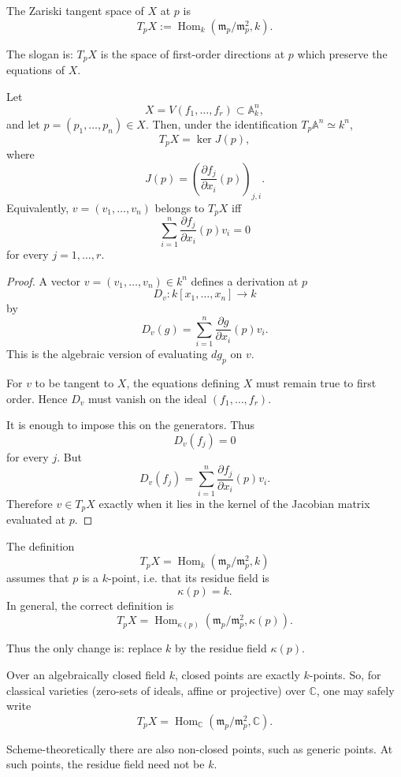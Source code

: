 \begin{definition}
\label{definition-zariski-tangent}
The Zariski tangent space of $X$
at $p$ is
$$
  T_pX
  :=
  \operatorname{Hom}_k
  (\mathfrak m_p/\mathfrak m_p^2,k).
$$
\end{definition}

The slogan is:
$T_pX$ is the space of first-order
directions at $p$ which preserve the
equations of $X$.

\begin{proposition}
\label{proposition-jacobian-tangent}
Let
$$
  X=V(f_1,\ldots,f_r)
  \subset \mathbb A_k^n,
$$
and let $p=(p_1,\ldots,p_n)\in X$.
Then, under the identification
$T_p\mathbb A^n\simeq k^n$,
$$
  T_pX=\ker J(p),
$$
where
$$
  J(p)
  =
  \left(
    \frac{\partial f_j}{\partial x_i}(p)
  \right)_{j,i}.
$$
Equivalently, $v=(v_1,\ldots,v_n)$
belongs to $T_pX$ iff
$$
  \sum_{i=1}^n
  \frac{\partial f_j}{\partial x_i}(p)
  v_i
  =
  0
$$
for every $j=1,\ldots,r$.
\end{proposition}

\begin{proof}
A vector $v=(v_1,\ldots,v_n)\in k^n$
defines a derivation at $p$
$$
  D_v:k[x_1,\ldots,x_n]\to k
$$
by
$$
  D_v(g)
  =
  \sum_{i=1}^n
  \frac{\partial g}{\partial x_i}(p)
  v_i.
$$
This is the algebraic version of
evaluating $dg_p$ on $v$.

For $v$ to be tangent to $X$, the
equations defining $X$ must remain true
to first order. Hence $D_v$ must vanish
on the ideal $(f_1,\ldots,f_r)$.

It is enough to impose this on the
generators. Thus
$$
  D_v(f_j)=0
$$
for every $j$. But
$$
  D_v(f_j)
  =
  \sum_{i=1}^n
  \frac{\partial f_j}{\partial x_i}(p)
  v_i.
$$
Therefore $v\in T_pX$ exactly when
it lies in the kernel of the Jacobian
matrix evaluated at $p$.
\end{proof}

\begin{remark}
\label{remark-residue-field}
The definition
$$
  T_pX
  =
  \operatorname{Hom}_k
  (\mathfrak m_p/\mathfrak m_p^2,k)
$$
assumes that $p$ is a $k$-point, i.e.
that its residue field is
$$
  \kappa(p)=k.
$$
In general, the correct definition is
$$
  T_pX
  =
  \operatorname{Hom}_{\kappa(p)}
  (\mathfrak m_p/\mathfrak m_p^2,\kappa(p)).
$$

Thus the only change is:
replace $k$ by the residue field
$\kappa(p)$.

Over an algebraically closed field $k$,
closed points are exactly $k$-points.
So, for classical varieties 
(zero-sets of ideals, affine or projective)
over $\mathbb C$, one may safely write
$$
  T_pX
  =
  \operatorname{Hom}_{\mathbb C}
  (\mathfrak m_p/\mathfrak m_p^2,\mathbb C).
$$

Scheme-theoretically there are also
non-closed points, such as generic
points. At such points, the residue
field need not be $k$.
\end{remark}



